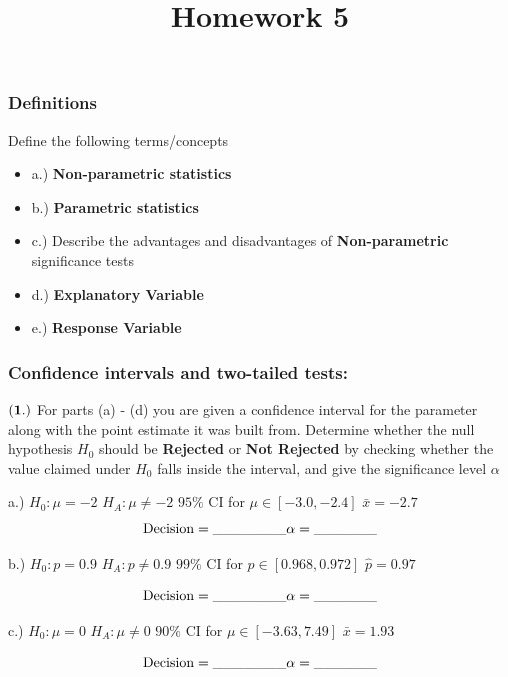 \documentclass[
]{article}
\title{Homework 5}
\author{}
\date{\vspace{-2.5em}}
\begin{document}
\maketitle

\subsubsection{Definitions}\label{definitions}

Define the following terms/concepts

\begin{itemize}
\item
  a.) \textbf{Non-parametric statistics}
\item
  b.) \textbf{Parametric statistics}
\item
  c.) Describe the advantages and disadvantages of
  \textbf{Non-parametric} significance tests
\item
  d.) \textbf{Explanatory Variable}
\item
  e.) \textbf{Response Variable}
\end{itemize}

\subsubsection{Confidence intervals and two-tailed
tests:}\label{confidence-intervals-and-two-tailed-tests}

\(\bf (1.)\) For parts (a) - (d) you are given a confidence interval for
the parameter along with the point estimate it was built from. Determine
whether the null hypothesis \(H_0\) should be \textbf{Rejected} or
\textbf{Not Rejected} by checking whether the value claimed under
\(H_0\) falls inside the interval, and give the significance level
\(\alpha\)

a.) \(H_0: \mu = -2\) \(H_A: \mu \neq -2\) \(95\%\) CI for
\(\mu \in [-3.0, -2.4]\) \(\bar{x} = -2.7\)
\[ \text{Decision} = \_\_\_\_\_\_\_ \\
  \alpha = \_\_\_\_\_\_ \]

b.) \(H_0: p = 0.9\) \(H_A: p \neq 0.9\) \(99\%\) CI for
\(p \in [0.968, 0.972]\) \(\hat{p} = 0.97\)

\[ \text{Decision} = \_\_\_\_\_\_\_ \\
  \alpha = \_\_\_\_\_\_ \]

c.) \(H_0: \mu = 0\) \(H_A: \mu \neq 0\) \(90\%\) CI for
\(\mu \in [-3.63, 7.49]\) \(\bar{x} = 1.93\)

\[ \text{Decision} = \_\_\_\_\_\_\_ \\
  \alpha = \_\_\_\_\_\_ \]
\end{document}
